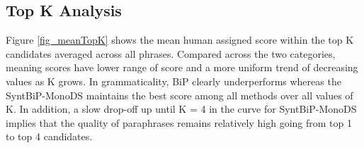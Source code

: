 \documentclass[11pt]{article}
\newcommand{\mnote}[1]{\marginpar{\raggedleft\footnotesize\itshape#1}}
\begin{document}
\subsection{Top K Analysis} %

Figure \ref{fig_meanTopK} shows the mean human assigned score within the top K candidates averaged across all phrases. 
Compared across the two categories, meaning scores have lower range of score and a more uniform trend of decreasing values as K grows.  In grammaticality, BiP clearly underperforms whereas the SyntBiP-MonoDS maintains the best score among all methods over all values of K. In addition, a slow drop-off up until K = 4 in the curve for SyntBiP-MonoDS implies that the quality of paraphrases remains relatively high going from top 1 to top 4 candidates.

\end{document}
